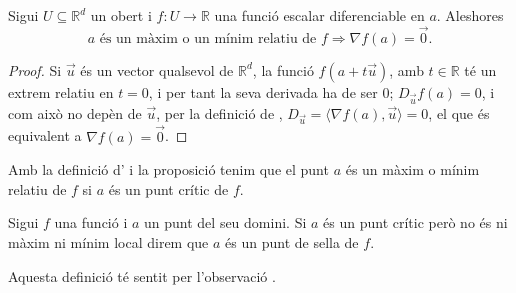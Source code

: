 \documentclass[../Apunts.tex]{subfiles}
\begin{document}
	\begin{proposition}\label{prop:Identificació d'extrems relatius}
		Sigui \(U\subseteq\mathbb{R}^{d}\) un obert i \(f\colon U\to\mathbb{R}\) una funció escalar diferenciable en \(a\). Aleshores
		\[a\text{ és un màxim o un mínim relatiu de }f\Longrightarrow \nabla f(a)=\vec{0}.\]
		\begin{proof}
			Si \(\vec{u}\) és un vector qualsevol de \(\mathbb{R}^{d}\), la funció \(f(a+t\vec{u})\), amb \(t\in\mathbb{R}\) té un extrem relatiu en \(t=0\), i per tant la seva derivada ha de ser 0; \(D_{\vec{u}}f(a)=0\), i com això no depèn de \(\vec{u}\), per la definició de , \(D_{\vec{u}}=\langle\nabla f(a),\vec{u}\rangle=0\), el que és equivalent a \(\nabla f(a)=\vec{0}\).
		\end{proof}
	\end{proposition}
	\begin{observation}\label{obs:extrem relatiu és punt crític}
		Amb la definició d' i la proposició  tenim que el punt \(a\) és un màxim o mínim relatiu de \(f\) si \(a\) és un punt crític de \(f\).
	\end{observation}
	\begin{definition}
		\label{def:punt de sella}
		Sigui \(f\) una funció i \(a\) un punt del seu domini. Si \(a\) és un punt crític però no és ni màxim ni mínim local direm que \(a\) és un punt de sella de \(f\).
		
		Aquesta definició té sentit per l'observació .
	\end{definition}
\end{document}
